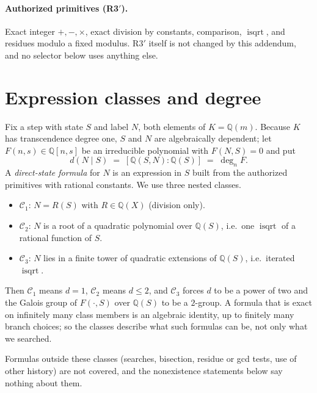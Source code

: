 \documentclass[11pt]{article}
\theoremstyle{definition}
\theoremstyle{remark}
\newcommand{\Q}{\mathbb{Q}}
\DeclareMathOperator{\isqrt}{isqrt}
\begin{document}
\paragraph{Authorized primitives (R3$'$).} Exact integer $+,-,\times$, exact division by constants, comparison, $\isqrt$, and residues modulo a fixed modulus. R3$'$ itself is not changed by this addendum, and no selector below uses anything else.

\section{Expression classes and degree}\label{sec:classes}
Fix a step with state $S$ and label $N$, both elements of $K=\Q(m)$. Because $K$ has transcendence degree one, $S$ and $N$ are algebraically dependent; let $F(n,s)\in\Q[n,s]$ be an irreducible polynomial with $F(N,S)=0$ and put
\[ d(N\mid S)\;=\;[\Q(S,N):\Q(S)]\;=\;\deg_n F. \]
A \emph{direct-state formula} for $N$ is an expression in $S$ built from the authorized primitives with rational constants. We use three nested classes.
\begin{itemize}\setlength\itemsep{1pt}
\item $\mathcal C_1$: $N=R(S)$ with $R\in\Q(X)$ (division only).
\item $\mathcal C_2$: $N$ is a root of a quadratic polynomial over $\Q(S)$, i.e.\ one $\isqrt$ of a rational function of $S$.
\item $\mathcal C_3$: $N$ lies in a finite tower of quadratic extensions of $\Q(S)$, i.e.\ iterated $\isqrt$.
\end{itemize}
Then $\mathcal C_1$ means $d=1$, $\mathcal C_2$ means $d\le 2$, and $\mathcal C_3$ forces $d$ to be a power of two and the Galois group of $F(\cdot,S)$ over $\Q(S)$ to be a $2$-group. A formula that is exact on infinitely many class members is an algebraic identity, up to finitely many branch choices; so the classes describe what such formulas can be, not only what we searched.

Formulas outside these classes (searches, bisection, residue or gcd tests, use of other history) are not covered, and the nonexistence statements below say nothing about them.
\end{document}
